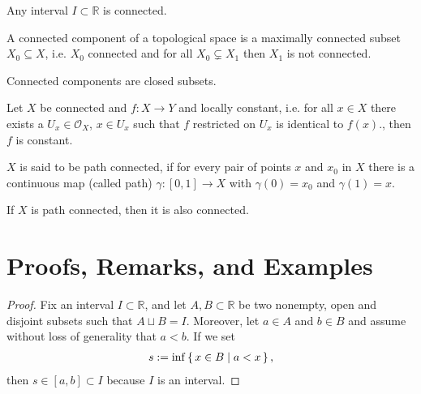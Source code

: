 \begin{thmbox}
    \begin{lemma}
        Any {\color{mathif}interval} \(I \subset \mathbb{R}\) is {\color{maththen}connected}.
    \end{lemma}
\end{thmbox}
%
\begin{defbox}
    \begin{definition}
        A connected component of a topological space is a maximally connected subset \(X_0 \subseteq X\), i.e. \(X_0\) connected and for all \(X_0 \subsetneq X_1\) then \(X_1\) is not connected.
    \end{definition}
\end{defbox}
%
\begin{thmbox}
    \begin{proposition}
        Connected components are closed subsets.
    \end{proposition}
\end{thmbox}
%
\begin{thmbox}
    \begin{lemma}[Lemma 11]
        Let \(X\) be connected and \(f: X \longrightarrow Y\) and locally constant, i.e. for all \(x \in X\) there exists a \(U_x \in \mathcal{O}_X\), \(x \in U_x\) such that \(f\) restricted on \(U_x\) is identical to \(f(x)\)., then \(f\) is constant.
    \end{lemma}
\end{thmbox}
%
\begin{defbox}
    \begin{definition}
        \(X\) is said to be {\color{maththen}path connected}, if for every pair of points \(x\) and \(x_0\) in \(X\) there is a continuous map (called path) \(\gamma: [0, 1] \longrightarrow X\) with \(\gamma(0) = x_0\) and \(\gamma(1) = x\).
    \end{definition}
\end{defbox}
%
\begin{thmbox}
    \begin{lemma}
        If \(X\) is path connected, then it is also connected.
    \end{lemma}
\end{thmbox}

\section{Proofs, Remarks, and Examples}

\begin{proof}
    Fix an interval \(I \subset \mathbb{R}\), and let \(A, B \subset \mathbb{R}\) be two nonempty, open and disjoint subsets such that \(A \sqcup B = I\). Moreover, let \(a \in A\) and \(b \in B\) and assume without loss of generality that \(a < b\). If we set
    \begin{align}
        s := \inf \left\{\, x \in B \mid a < x \,\right\} \text{,}
    \end{align}
    then \(s \in [a, b] \subset I\) because \(I\) is an interval.   
\end{proof}

